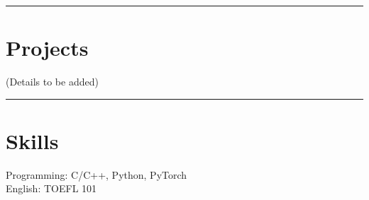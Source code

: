 \documentclass[11pt,a4paper]{article}
\newcommand{\sepbar}{\vspace{3pt}\hrule\vspace{6pt}}
\begin{document}
\sepbar


\section*{Projects}
(Details to be added)

\sepbar

\section*{Skills}
Programming: C/C++, Python, PyTorch \\
English: TOEFL 101
\end{document}
